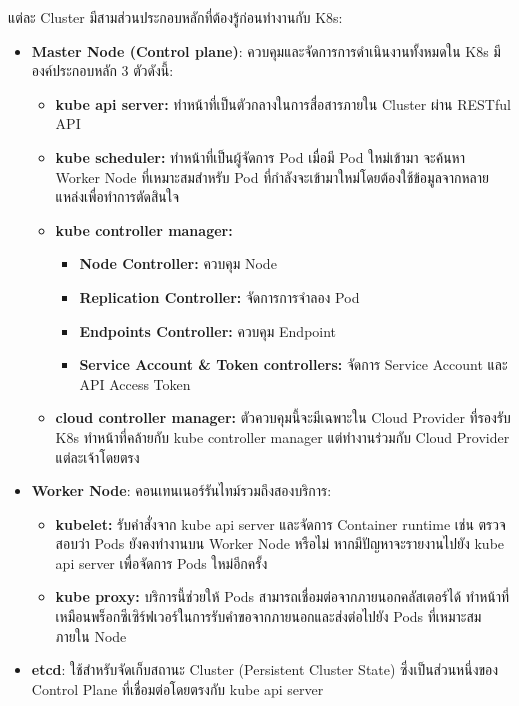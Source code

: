 แต่ละ Cluster มีสามส่วนประกอบหลักที่ต้องรู้ก่อนทำงานกับ K8s:
\begin{itemize}
    \item \textbf{Master Node (Control plane)}: ควบคุมและจัดการการดำเนินงานทั้งหมดใน K8s มีองค์ประกอบหลัก 3 ตัวดังนี้:
          \begin{itemize}
              \item \textbf{kube api server:} ทำหน้าที่เป็นตัวกลางในการสื่อสารภายใน Cluster ผ่าน RESTful API
              \item \textbf{kube scheduler:} ทำหน้าที่เป็นผู้จัดการ Pod เมื่อมี Pod ใหม่เข้ามา จะค้นหา Worker Node ที่เหมาะสมสำหรับ Pod ที่กำลังจะเข้ามาใหม่โดยต้องใช้ข้อมูลจากหลายแหล่งเพื่อทำการตัดสินใจ
              \item \textbf{kube controller manager:}
                    \begin{itemize}
                        \item \textbf{Node Controller:} ควบคุม Node
                        \item \textbf{Replication Controller:} จัดการการจำลอง Pod
                        \item \textbf{Endpoints Controller:} ควบคุม Endpoint
                        \item \textbf{Service Account \& Token controllers:} จัดการ Service Account และ API Access Token
                    \end{itemize}
              \item \textbf{cloud controller manager:} ตัวควบคุมนี้จะมีเฉพาะใน Cloud Provider ที่รองรับ K8s ทำหน้าที่คล้ายกับ kube controller manager แต่ทำงานร่วมกับ Cloud Provider แต่ละเจ้าโดยตรง
          \end{itemize}
          \clearpage
    \item \textbf{Worker Node}: คอนเทนเนอร์รันไทม์รวมถึงสองบริการ:
          \begin{itemize}
              \item \textbf{kubelet:} รับคำสั่งจาก kube api server และจัดการ Container runtime เช่น ตรวจสอบว่า Pods ยังคงทำงานบน Worker Node หรือไม่ หากมีปัญหาจะรายงานไปยัง kube api server เพื่อจัดการ Pods ใหม่อีกครั้ง
              \item \textbf{kube proxy:} บริการนี้ช่วยให้ Pods สามารถเชื่อมต่อจากภายนอกคลัสเตอร์ได้ ทำหน้าที่เหมือนพร็อกซีเซิร์ฟเวอร์ในการรับคำขอจากภายนอกและส่งต่อไปยัง Pods ที่เหมาะสมภายใน Node
          \end{itemize}

    \item \textbf{etcd}: ใช้สำหรับจัดเก็บสถานะ Cluster (Persistent Cluster State) ซึ่งเป็นส่วนหนึ่งของ Control Plane ที่เชื่อมต่อโดยตรงกับ kube api server
\end{itemize}
